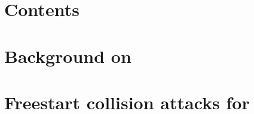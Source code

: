 \cleardoublepage
\chapter*{Contents}
\parttoc



\chapter[Contexte sur \shaone]
        {Background on \shaone}
\label{cha:shaone_cont}







\chapter[Collisions à initialisation libres pour \shaone]
        {Freestart collision attacks for \shaone}
\label{cha:shaone_new}









\FloatBarrier




\FloatBarrier
